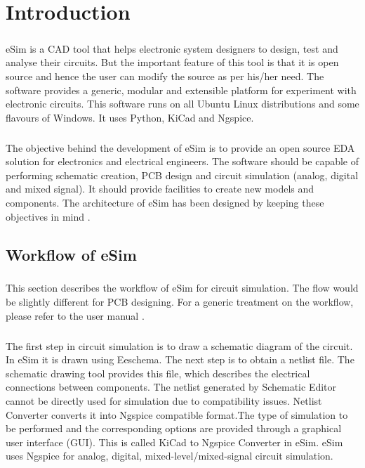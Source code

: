 \chapter{Introduction}

\paragraph{}eSim is a CAD tool that helps electronic system designers to design, test and analyse
their circuits. But the important feature of this tool is that it is open source and hence
the user can modify the source as per his/her need. The software provides a generic,
modular and extensible platform for experiment with electronic circuits. This software
runs on all Ubuntu Linux distributions and some flavours of Windows. It uses Python,
KiCad and Ngspice.

\paragraph{}

The objective behind the development of eSim is to provide an open source EDA
solution for electronics and electrical engineers. The software should be capable of
performing schematic creation, PCB design and circuit simulation (analog, digital and
mixed signal). It should provide facilities to create new models and components. The
architecture of eSim has been designed by keeping these objectives in mind \cite{esimusermanual} .

\section{Workflow of eSim}
\paragraph{}

This section describes the workflow of eSim for circuit simulation. The flow would be slightly different for PCB designing. For a generic treatment on the workflow, please refer to the user manual .

\paragraph{}

The first step in circuit simulation is to draw a schematic diagram of the circuit. In eSim it is drawn using Eeschema. The next step is to obtain a netlist file. The schematic drawing tool provides this file, which describes the electrical connections between components.
The netlist generated by Schematic Editor cannot be directly used for simulation due to compatibility issues. Netlist Converter converts it into Ngspice compatible format.The type of simulation to be performed and the corresponding options are provided through a graphical user interface (GUI). This is called KiCad to Ngspice Converter in eSim. 
eSim uses Ngspice for analog, digital, mixed-level/mixed-signal circuit simulation.


